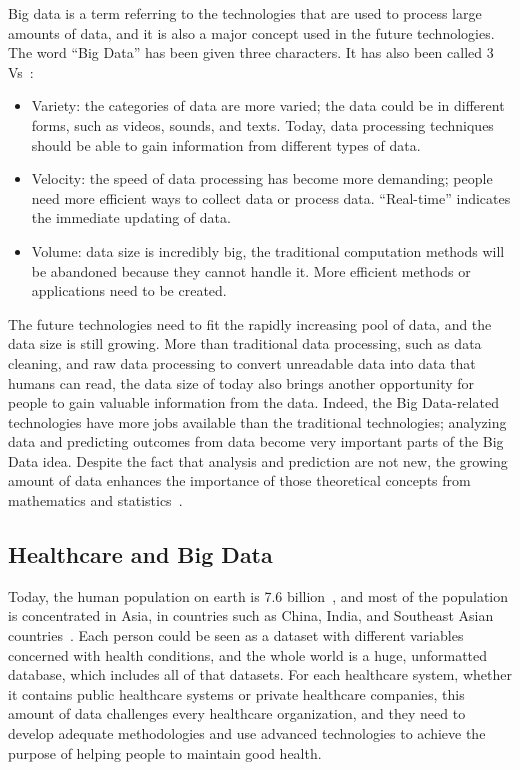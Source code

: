 Big data is a term referring to the technologies that are used to 
process large amounts of data, and it is also a major concept 
used in the future technologies. The word 
``Big Data'' has been given three characters. 
It has also been called 3 Vs~\cite{3v}:
\begin{itemize}
	\item Variety: the categories of data are more varied; the data could be in 
	different forms, such as videos, sounds, and texts. Today, data processing 
	techniques should be able to gain information from different types of 
	data.
	\item Velocity: the speed of data processing has become more demanding; 
	people need more efficient ways to collect data or process data. 
	``Real-time'' indicates the immediate updating of data.
	\item Volume: data size is incredibly big, the traditional computation 
	methods will be abandoned because they cannot handle it. 
	More efficient methods or applications need to be created.
\end{itemize}

The future technologies need to fit the rapidly increasing pool of
data, and the data size is still growing. More than traditional data 
processing, such as data cleaning, and raw data processing to 
convert unreadable data into data that humans can read, the 
data size of today also brings 
another opportunity for people to gain valuable information from the data. 
Indeed, the Big Data-related technologies have more jobs available than the 
traditional technologies; analyzing data and predicting outcomes 
from data become 
very important parts of the Big Data idea. Despite the fact that analysis
and prediction are not new, the growing amount of data enhances the 
importance of those theoretical concepts from mathematics and 
statistics~\cite{Moura}.

\subsection{Healthcare and Big Data}
Today, the human population on earth is 7.6 billion~\cite{p2018_1}, and 
most of the population is concentrated in Asia, in countries such as 
China, India, and 
Southeast Asian countries~\cite{p2018_2}. Each person 
could be seen as a dataset with different variables concerned with health 
conditions, and the whole world is a huge, unformatted database, which 
includes all of that datasets. For each healthcare system, whether 
it contains public 
healthcare systems or private healthcare companies, this amount of data 
challenges every healthcare organization, and they need to develop 
adequate methodologies and use advanced technologies to achieve the 
purpose of helping people to maintain good health.


